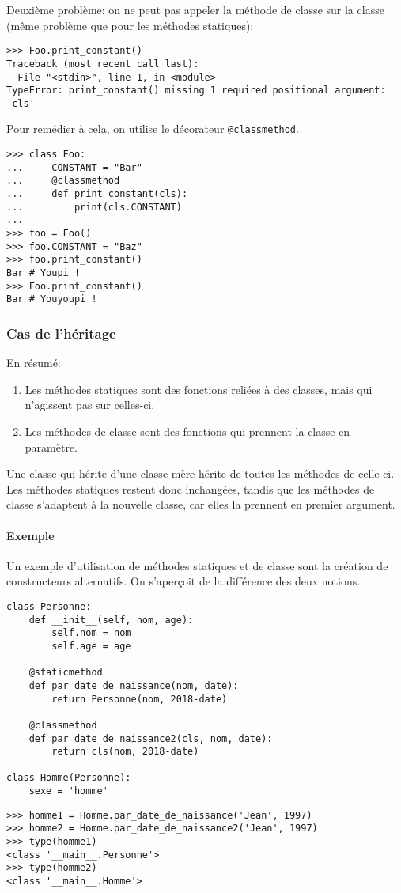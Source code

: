 Deuxième problème: on ne peut pas appeler la méthode de classe sur la classe (même problème que pour les méthodes statiques):

\begin{verbatim}
>>> Foo.print_constant()
Traceback (most recent call last):
  File "<stdin>", line 1, in <module>
TypeError: print_constant() missing 1 required positional argument: 'cls'
\end{verbatim}

Pour remédier à cela, on utilise le décorateur \texttt{@classmethod}.

\begin{verbatim}
>>> class Foo:
...     CONSTANT = "Bar"
...     @classmethod
...     def print_constant(cls):
...         print(cls.CONSTANT)
...
>>> foo = Foo()
>>> foo.CONSTANT = "Baz"
>>> foo.print_constant()
Bar # Youpi !
>>> Foo.print_constant()
Bar # Youyoupi !
\end{verbatim}

\subsubsection{Cas de l'héritage}
En résumé:
\begin{enumerate}
	\item Les méthodes statiques sont des fonctions reliées à des classes, mais qui n'agissent pas sur celles-ci.
	\item Les méthodes de classe sont des fonctions qui prennent la classe en paramètre.
\end{enumerate}

Une classe qui hérite d'une classe mère hérite de toutes les méthodes de celle-ci. Les méthodes statiques restent donc inchangées, tandis que les méthodes de classe s'adaptent à la nouvelle classe, car elles la prennent en premier argument.

\paragraph{Exemple} Un exemple d'utilisation de méthodes statiques et de classe sont la création de constructeurs alternatifs. On s'aperçoit de la différence des deux notions.
\begin{verbatim}
class Personne:
    def __init__(self, nom, age):
        self.nom = nom
        self.age = age

    @staticmethod
    def par_date_de_naissance(nom, date):
        return Personne(nom, 2018-date)

    @classmethod
    def par_date_de_naissance2(cls, nom, date):
        return cls(nom, 2018-date)

class Homme(Personne):
    sexe = 'homme'
\end{verbatim}
\begin{verbatim}
>>> homme1 = Homme.par_date_de_naissance('Jean', 1997)
>>> homme2 = Homme.par_date_de_naissance2('Jean', 1997)
>>> type(homme1)
<class '__main__.Personne'>
>>> type(homme2)
<class '__main__.Homme'>
\end{verbatim}

